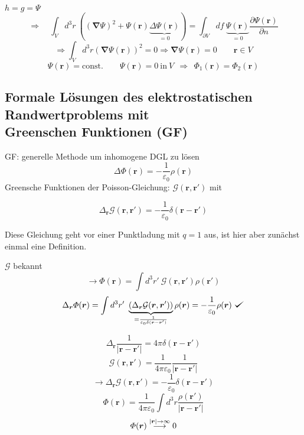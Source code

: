 \documentclass[titlepage,11pt,a4paper,ngerman]{report}
\def\checkmark{\tikz\fill[scale=0.4](0,.35) -- (.25,0) -- (1,.7) -- (.25,.15) -- cycle;}
\newcommand{\tx}[1]{\textrm{#1}}
\newcommand{\const}{\tx{const.}}
\newcommand{\gre}{\mathcal{G}}
\newcommand{\pofr}{\Phi(\vec{r})}
\renewcommand{\Phi}{\varPhi}
\renewcommand{\vec}[1]{\boldsymbol{#1}}
\newcommand{\lcom}[1]{\color{MidnightBlue}#1\color{black}}
\renewcommand{\epsilon}{\varepsilon}
\newcommand{\vabla}{\boldsymbol{\nabla}}
\newcommand{\frbox}[2]{\begin{tcolorbox}[colback=white,colframe=red!75!black,fonttitle=\bfseries,title=#1]#2\end{tcolorbox}}
\begin{document}
$h = g = \varPsi$
$$\Rightarrow \quad \int_V d^3 r\ ((\vabla \varPsi)^2 + \varPsi(\vec{r}) \underbrace{\Delta \varPsi(\vec{r})}_{=0}) = \int_{\partial V} df\ \underbrace{\varPsi(\vec{r})}_{=0} \frac{\partial \varPsi(\vec{r})}{\partial n} $$
\begin{equation*}
\Rightarrow \int_V d^3 r \left(\vec{\nabla} \varPsi(\vec{r}) \right)^2 = 0 \Rightarrow \vec{\nabla} \varPsi(\vec{r}) = 0 \qquad \vec{r} \in V
\end{equation*}
\begin{equation*}
\varPsi(\vec{r}) = \const \qquad \varPsi(\vec{r}) = 0 \ \tx{in} \ V \ \ \Rightarrow \ \ \Phi_1(\vec{r}) = \Phi_2(\vec{r})
\end{equation*}

\subsection{Formale Lösungen des elektrostatischen Randwertproblems mit \texorpdfstring{\\}{newline} Greenschen Funktionen (GF)}
GF: generelle Methode um inhomogene DGL zu lösen
\begin{equation*}
\Delta \pofr = - \frac{1}{\epsilon_0} \rho(\vec{r})
\end{equation*}
Greensche Funktionen der Poisson-Gleichung: $ \gre(\vec{r},\vec{r}') $ mit
\frbox{Greensche Funktionen der Poisson-Gleichung}{\begin{equation*}
\Delta_{\vec{r}} \gre(\vec{r},\vec{r}') = - \frac{1}{\epsilon_0} \delta(\vec{r} - \vec{r}')
\end{equation*}}
\noindent
\lcom{Diese Gleichung geht vor einer Punktladung mit $ q=1 $ aus, ist hier aber zunächst einmal eine Definition.}

$\mathcal G$ bekannt 
$$\rightarrow \pofr = \int d^3 r'\ \mathcal G(\vec{r}, \vec{r}') \rho(\vec{r}')$$
$$\Delta_{\vec{r}} \pofr = \int d^3 r'\ \underbrace{(\Delta_{\vec{r}} \mathcal G(\vec{r}, \vec{r}'))}_{= \frac{1}{\epsilon_0 \delta(\vec{r}-\vec{r}')}} \rho (\vec{r}) = - \frac{1}{\epsilon_0} \rho (\vec{r})\ \checkmark$$

\begin{equation*}
\Delta_{\vec{r}} \frac{1}{|\vec{r} - \vec{r}'|} = 4 \pi \delta(\vec{r} - \vec{r}')
\end{equation*}
\begin{equation*}
\gre(\vec{r},\vec{r}') = \frac{1}{4 \pi \epsilon_0} \frac{1}{|\vec{r} - \vec{r}'|}
\end{equation*}
\begin{equation*}
\rightarrow \Delta_{\vec{r}} \gre(\vec{r}, \vec{r}') = - \frac{1}{\epsilon_0} \delta(\vec{r} - \vec{r}')
\end{equation*}
\begin{equation*}
\pofr = \frac{1}{4 \pi \epsilon_0} \int d^3 r \frac{\rho(\vec{r}')}{|\vec{r} - \vec{r}'|}
\end{equation*}
\begin{equation*}
\pofr \buildrel |\vec{r}| \to \infty \over \longrightarrow 0
\end{equation*}
\end{document}
